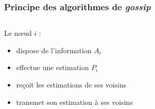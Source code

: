 \documentclass[a4paper, c]{beamer}
\begin{document}
\begin{frame}
    \frametitle{Principe des algorithmes de \emph{gossip}}

    \begin{columns}
        \begin{column}{.6\textwidth}
            Le n\oe{}ud $i$ :
            \begin{itemize}
                \item dispose de l'information $A_i$
                \item effectue une estimation $P_i$
                \item<2-> reçoit les estimations de ses voisins
                \item<4-> transmet son estimation à ses voisins
            \end{itemize}
        \end{column}
        \begin{column}{.4\textwidth}
\end{column}
\end{columns}
\end{frame}
\end{document}
